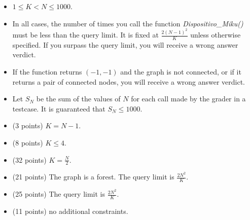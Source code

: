 \documentclass[12pt]{scrartcl}
\begin{document}
        \begin{itemize}
            \item $1 \le K < N \le 1000$.
            \item In all cases, the number of times you call the function \textit{Dispositivo\_Miku()} must be less than the query limit. It is fixed at $\frac{2(N - 1)^2}{K}$ unless otherwise specified. If you surpass the query limit, you will receive a wrong answer verdict.
            \item If the function returns $(-1, -1)$ and the graph is not connected, or if it returns a pair of connected nodes, you will receive a wrong answer verdict.
            \item Let $S_N$ be the sum of the values of $N$ for each call made by the grader in a testcase. It is guaranteed that $S_N \le 1000$.
        \end{itemize}
    

    \begin{itemize}
        \item (3 points) $K = N - 1$.
        \item (8 points) $K \le 4$. 
        \item (32 points) $K = \frac{N}{2}$.
        \item (21 points) The graph is a forest. The query limit is $\frac{2N^2}{K}$.
        \item (25 points) The query limit is $\frac{2N^2}{K}$.
        \item (11 points) no additional constraints.
    \end{itemize}
\end{document}
